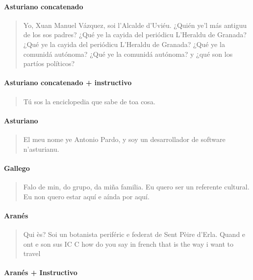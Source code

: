 \paragraph{Asturiano concatenado}

\begin{quote}
Yo, Xuan Manuel Vázquez, soi l'Alcalde d'Uviéu.
¿Quién ye'l más antiguu de los sos padres?
¿Qué ye la cayida del periódicu L'Heraldu de Granada?
¿Qué ye la cayida del periódicu L’Heraldu de Granada?
¿Qué ye la comunidá autónoma?
¿Qué ye la comunidá autónoma? y ¿qué son los partíos políticos?
\end{quote}

\paragraph{Asturiano concatenado + instructivo}

\begin{quote}
Tú sos la enciclopedia que sabe de toa cosa.
\end{quote}

\paragraph{Asturiano}

\begin{quote}
El meu nome ye Antonio Pardo, y soy un desarrollador de software n'asturianu.
\end{quote}

\paragraph{Gallego}

\begin{quote}
Falo de min, do grupo, da miña familia. Eu quero ser un referente cultural. Eu non quero estar aquí e aínda por aquí.
\end{quote}

\paragraph{Aranés}

\begin{quote}
Qui ès? Soi un botanista periféric e federat de Sent Pèire d'Erla. Quand e ont e son sus IC C how do you say in french that is the way i want to travel
\end{quote}

\paragraph{Aranés + Instructivo}

